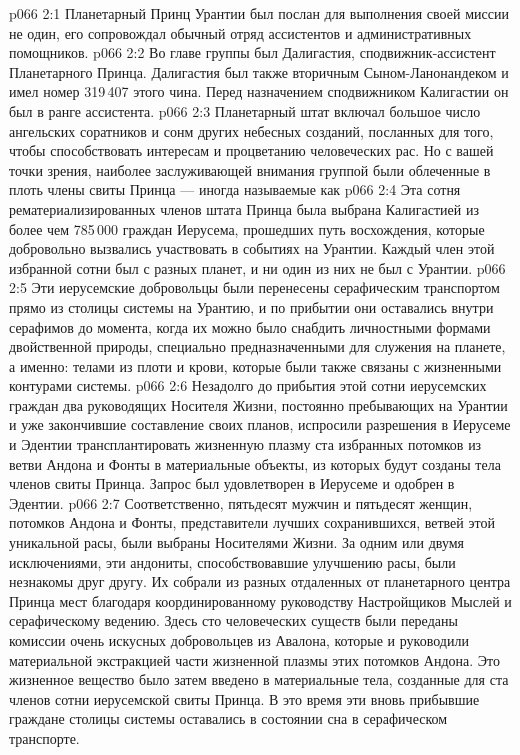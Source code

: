 \vs p066 2:1 Планетарный Принц Урантии был послан для выполнения своей миссии не один, его сопровождал обычный отряд ассистентов и административных помощников.
\vs p066 2:2 Во главе группы был Далигастия, сподвижник\hyp{}ассистент Планетарного Принца. Далигастия был также вторичным Сыном\hyp{}Ланонандеком и имел номер 319\,407 этого чина. Перед назначением сподвижником Калигастии он был в ранге ассистента.
\vs p066 2:3 Планетарный штат включал большое число ангельских соратников и сонм других небесных созданий, посланных для того, чтобы способствовать интересам и процветанию человеческих рас. Но с вашей точки зрения, наиболее заслуживающей внимания группой были облеченные в плоть члены свиты Принца --- иногда называемые как 
\vs p066 2:4 \pc Эта сотня рематериализированных членов штата Принца была выбрана Калигастией из более чем 785\,000 граждан Иерусема, прошедших путь восхождения, которые добровольно вызвались участвовать в событиях на Урантии. Каждый член этой избранной сотни был с разных планет, и ни один из них не был с Урантии.
\vs p066 2:5 Эти иерусемские добровольцы были перенесены серафическим транспортом прямо из столицы системы на Урантию, и по прибытии они оставались внутри серафимов до момента, когда их можно было снабдить личностными формами двойственной природы, специально предназначенными для служения на планете, а именно: телами из плоти и крови, которые были также связаны с жизненными контурами системы.
\vs p066 2:6 \pc Незадолго до прибытия этой сотни иерусемских граждан два руководящих Носителя Жизни, постоянно пребывающих на Урантии и уже закончившие составление своих планов, испросили разрешения в Иерусеме и Эдентии трансплантировать жизненную плазму ста избранных потомков из ветви Андона и Фонты в материальные объекты, из которых будут созданы тела членов свиты Принца. Запрос был удовлетворен в Иерусеме и одобрен в Эдентии.
\vs p066 2:7 Соответственно, пятьдесят мужчин и пятьдесят женщин, потомков Андона и Фонты, представители лучших сохранившихся, ветвей этой уникальной расы, были выбраны Носителями Жизни. За одним или двумя исключениями, эти андониты, способствовавшие улучшению расы, были незнакомы друг другу. Их собрали из разных отдаленных от планетарного центра Принца мест благодаря координированному руководству Настройщиков Мыслей и серафическому ведению. Здесь сто человеческих существ были переданы комиссии очень искусных добровольцев из Авалона, которые и руководили материальной экстракцией части жизненной плазмы этих потомков Андона. Это жизненное вещество было затем введено в материальные тела, созданные для ста членов сотни иерусемской свиты Принца. В это время эти вновь прибывшие граждане столицы системы оставались в состоянии сна в серафическом транспорте.
